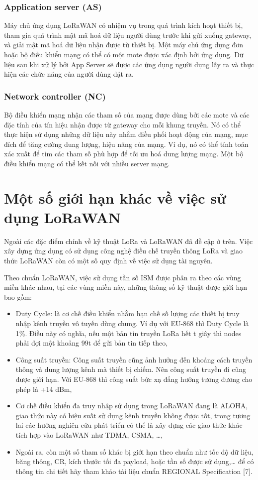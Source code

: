 	\subsubsection{Application server (AS)}
	Máy chủ ứng dụng LoRaWAN có nhiệm vụ trong quá trình kích hoạt thiết bị, tham gia quá trình mật mã hoá dữ liệu người dùng trước khi gửi xuống gateway, và giải mật mã hoá dữ liệu nhận được từ thiết bị. Một máy chủ ứng dụng đơn hoặc bộ điều khiển mạng có thể có một mote được xác định bởi ứng dụng. Dữ liệu sau khi xử lý bởi App Server sẽ được các ứng dụng người dụng lấy ra và thực hiện các chức năng của người dùng đặt ra.
	\subsubsection{Network controller (NC)}
	Bộ điều khiển mạng nhận các tham số của mạng được dùng bởi các mote và các đặc tính của tín hiệu nhận được từ gateway cho mỗi khung truyền. Nó có thể thực hiện sử dụng những dữ liệu này nhằm điều phối hoạt động của mạng, mục đích để tăng cường dung lượng, hiệu năng của mạng. Ví dụ, nó có thể tính toán xác xuất để tìm các tham số phù hợp để tối ưu hoá dung lượng mạng. Một bộ điều khiển mạng có thể kết nối với nhiều server mạng. 
	
	\section{Một số giới hạn khác về việc sử dụng LoRaWAN}
Ngoài các đặc điểm chính về kỹ thuật LoRa và LoRaWAN đã đề cập ở trên. Việc xây dựng ứng dụng có sử dụng công nghệ điều chế truyền thông LoRa và giao thức LoRaWAN còn có một số quy định về việc sử dụng tài nguyên. \par 
	Theo chuẩn LoRaWAN, việc sử dụng tần số ISM được phân ra theo các vùng miền khác nhau, tại các vùng miền này, những thông số kỹ thuật được giới hạn bao gồm:
	\begin{itemize}
	\item	Duty Cycle: là cơ chế điều khiển nhằm hạn chế số lượng các thiết bị truy nhập kênh truyền vô tuyến dùng chung. Ví dụ với EU-868 thì Duty Cycle là 1\%. Điều này có nghĩa, nếu một bản tin truyền LoRa hết t giây thì nodes phải đợi một khoảng 99t để gửi bản tin tiếp theo,
\item	Công suất truyền: Công suất truyền cũng ảnh hưởng đến khoảng cách truyền thông và dung lượng kênh mà thiết bị chiếm. Nên công suất truyền đi cũng được giới hạn. Với EU-868 thì công suất bức xạ đẳng hướng tương đương cho phép là +14 dBm,
\item	Cơ chế điều khiển đa truy nhập sử dụng trong LoRaWAN đang là ALOHA, giao thức này có hiệu suất sử dụng kênh truyền không được tốt, trong tương lai các hướng nghiên cứu phát triển có thể là xây dựng các giao thức khác tích hợp vào LoRaWAN như TDMA, CSMA, …,
\item	Ngoài ra, còn một số tham số khác bị giới hạn theo chuẩn như tốc độ dữ liệu, băng thông, CR, kích thước tối đa payload, hoặc tần số được sử dụng,… để có thông tin chi tiết hãy tham khảo tài liệu chuẩn REGIONAL Specification [7].

	\end{itemize}
	
